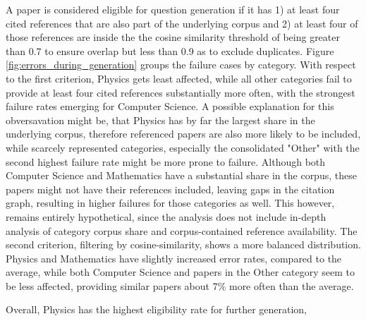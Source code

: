 A paper is considered eligible for question generation if it has 1) at least four cited references that are also part of the underlying corpus and 2) at least four of those references are inside the the cosine similarity threshold of being greater than 0.7 to ensure overlap but less than 0.9 as to exclude duplicates. Figure \ref{fig:errors_during_generation} groups the failure cases by category. 
With respect to the first criterion, Physics gets least affected, while all other categories fail to provide at least four cited references substantially more often, with the strongest failure rates emerging for Computer Science. 
A possible explanation for this obversavation might be, that Physics has by far the largest share in the underlying corpus, therefore referenced papers are also more likely to be included, while scarcely represented categories, especially the consolidated "Other" with the second highest failure rate might be more prone to failure. Although both Computer Science and Mathematics have a substantial share in the corpus, these papers might not have their references included, leaving gaps in the citation graph, resulting in higher failures for those categories as well.
This however, remains entirely hypothetical, since the analysis does not include in-depth analysis of category corpus share and corpus-contained reference availability.
The second criterion, filtering by cosine-similarity, shows a more balanced distribution. Physics and Mathematics have slightly increased error rates, compared to the average, while both Computer Science and papers in the Other category seem to be less affected, providing similar papers about 7\% more often than the average. 

Overall, Physics has the highest eligibility rate for further generation, 

